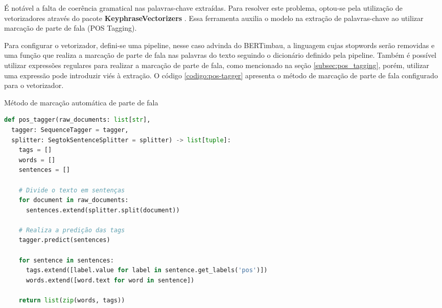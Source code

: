 

É notável a falta de coerência gramatical nas palavras-chave extraídas. Para resolver este problema, optou-se pela utilização de vetorizadores através do pacote \textbf{KeyphraseVectorizers} \cite{schopf_etal_kdir22}. Essa ferramenta auxilia o modelo na extração de palavras-chave ao utilizar marcação de parte de fala (POS Tagging).

Para configurar o vetorizador, defini-se uma pipeline, nesse caso advinda do BERTimbau, a linguagem cujas stopwords serão removidas e uma função que realiza a marcação de parte de fala nas palavras do texto seguindo o dicionário definido pela pipeline. Também é possível utilizar expressões regulares para realizar a marcação de parte de fala, como mencionado na seção \ref{subsec:pos_tagging}, porém, utilizar uma expressão pode introduzir viés à extração. O código \ref{codigo:pos-tagger} apresenta o método de marcação de parte de fala configurado para o vetorizador.

\begin{sourcecode}[H]
  \caption{\label{codigo:pos-tagger}Método de marcação automática de parte de fala}
  \begin{lstlisting}[frame=single, language=Python]
def pos_tagger(raw_documents: list[str], 
  tagger: SequenceTagger = tagger, 
  splitter: SegtokSentenceSplitter = splitter) -> list[tuple]:
    tags = []
    words = []
    sentences = []

    # Divide o texto em sentenças
    for document in raw_documents:
      sentences.extend(splitter.split(document))

    # Realiza a predição das tags
    tagger.predict(sentences)

    for sentence in sentences:
      tags.extend([label.value for label in sentence.get_labels('pos')])
      words.extend([word.text for word in sentence])

    return list(zip(words, tags))
\end{lstlisting}
  \fonte{}
\end{sourcecode}

